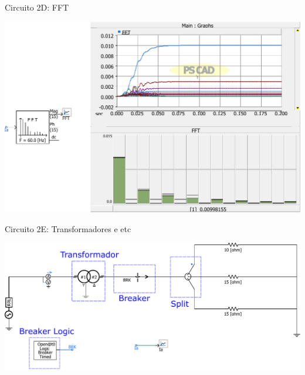 \begin{frame}{Circuito 2D: FFT}
\centering


\includegraphics[width=0.70\linewidth]{./figuras/Segundo-Circuito/SIM2d-FFT}

\end{frame}




\begin{frame}{Circuito 2E: Transformadores e etc}
\centering


\includegraphics[width=0.70\linewidth]{./figuras/Segundo-Circuito/SIM2e}

\end{frame}






